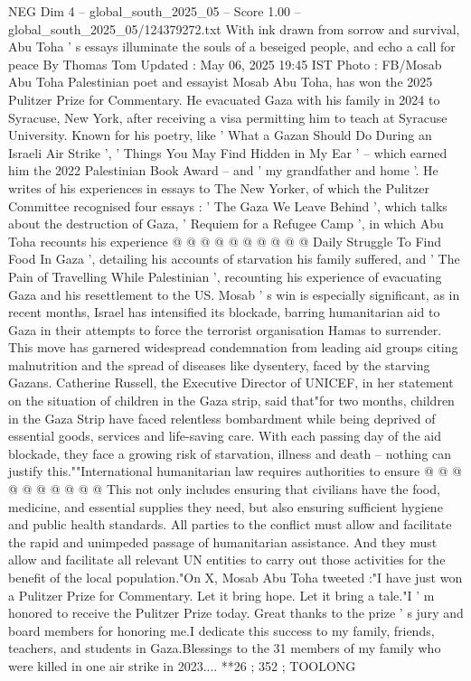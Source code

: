 \begin{textsample}{NEG Dim 4 – global\_south\_2025\_05 – Score 1.00 – global\_south\_2025\_05/124379272.txt}  \label{ex:f4_neg_365}
With ink drawn from sorrow and survival, Abu Toha ' s essays illuminate the souls of a beseiged people, and echo a call for peace By Thomas Tom Updated : May 06, 2025 19:45 IST Photo : FB/Mosab Abu Toha Palestinian poet and essayist Mosab Abu Toha, has won the 2025 Pulitzer Prize for Commentary.
He evacuated Gaza with his family in 2024 to Syracuse, New York, after receiving a visa permitting him to teach at Syracuse University.
Known for his poetry, like ' What a Gazan Should Do During an Israeli Air Strike ', ' Things You May Find Hidden in My Ear ' -- which earned him the 2022 Palestinian Book Award -- and ' my grandfather and home '.
He writes of his experiences in essays to The New Yorker, of which the Pulitzer Committee recognised four essays : ' The Gaza We Leave Behind ', which talks about the destruction of Gaza, ' Requiem for a Refugee Camp ', in which Abu Toha recounts his experience @ @ @ @ @ @ @ @ @ @ Daily Struggle To Find Food In Gaza ', detailing his accounts of starvation his family suffered, and ' The Pain of Travelling While Palestinian ', recounting his experience of evacuating Gaza and his resettlement to the US.
Mosab ' s win is especially significant, as in recent months, Israel has intensified its blockade, barring humanitarian aid to Gaza in their attempts to force the terrorist organisation Hamas to surrender.
This move has garnered widespread condemnation from leading aid groups citing malnutrition and the spread of diseases like dysentery, faced by the starving Gazans.
Catherine Russell, the Executive Director of UNICEF, in her statement on the situation of children in the Gaza strip, said that"for two months, children in the Gaza Strip have faced relentless bombardment while being deprived of essential goods, services and life-saving care.
With each passing day of the aid blockade, they face a growing risk of starvation, illness and death -- nothing can justify this.""International humanitarian law requires authorities to ensure @ @ @ @ @ @ @ @ @ @ This not only includes ensuring that civilians have the food, medicine, and essential supplies they need, but also ensuring sufficient hygiene and public health standards.
All parties to the conflict must allow and facilitate the rapid and unimpeded passage of humanitarian assistance.
And they must allow and facilitate all relevant UN entities to carry out those activities for the benefit of the local population."On X, Mosab Abu Toha tweeted :"I have just won a Pulitzer Prize for Commentary.
Let it bring hope.
Let it bring a tale."I ' m honored to receive the Pulitzer Prize today.
Great thanks to the prize ' s jury and board members for honoring me.I dedicate this success to my family, friends, teachers, and students in Gaza.Blessings to the 31 members of my family who were killed in one air strike in 2023.... **26 ; 352 ; TOOLONG

\end{textsample}
